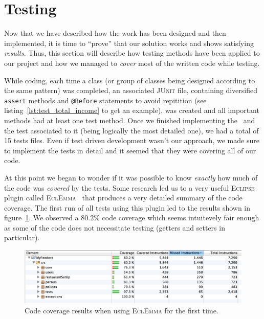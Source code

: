 \section{Testing} %
\label{sec:testing}
Now that we have described how the work has been designed and then implemented,
it is time to ``prove'' that our solution works and shows satisfying \emph{results}.
Thus, this section will describe how testing methods have been applied to our project
and how we managed to \emph{cover} most of the written code while testing.

While coding, each time a class (or group of classes being designed according to the same pattern)
was completed, an associated \textsc{JUnit} file, containing diversified \lstinline|assert|
methods and \lstinline|@Before| statements to avoid repitition
(see listing~\ref{lst:test_total_income} to get an example),
was created and all important
methods had at least one test method.
Once we finished implementing the \Core~and the test associated
to it (being logically the most detailed one), we had a total of 15 tests
files.
Even if test driven development wasn't our approach, we made sure to implement the tests in detail and it seemed that they were
covering all of our code.

At this point we began to wonder if it was possible to know \emph{exactly}
how much of the code was \emph{covered} by the tests.
Some research led us to a very useful \textsc{Eclipse} plugin
called \textsc{EclEmma}~\cite{eclemma} that produces a very
detailed summary of the code coverage.
The first run of all tests using this plugin led to the
results shown in figure~\ref{fig:coverage_first}.
We observed a $80.2\%$ code coverage which seems intuitevely
fair enough as some of the code does not necessitate testing (getters and setters in particular).

\begin{figure}[h]
  \begin{center}
    \includegraphics[scale=0.47]{./img/coverage_start.png} 
  \end{center}
  \caption{Code coverage results when using \textsc{EclEmma} for
  the first time.}
  \label{fig:coverage_first}
\end{figure} 

